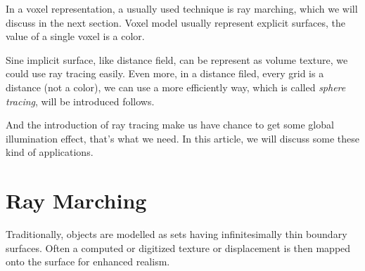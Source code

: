 In a voxel representation, a usually used technique is ray marching, which we will discuss in the next section. Voxel model usually represent explicit surfaces, the value of a single voxel is a color. 

Sine implicit surface, like distance field, can be represent as volume texture, we could use ray tracing easily. Even more, in a distance filed, every grid is a distance (not a color), we can use a more efficiently way, which is called \textit{sphere tracing}, will be introduced follows.    

And the introduction of ray tracing make us have chance to get some global illumination effect, that's what we need. In this article, we will discuss some these kind of applications.




\section{Ray Marching}
Traditionally, objects are modelled as sets having infinitesimally thin boundary surfaces. Often a computed or digitized texture or displacement is then mapped onto the surface for enhanced realism. 

